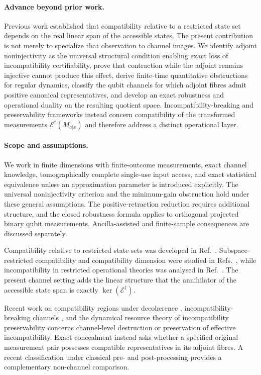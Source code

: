 \documentclass[
aps,pra,twocolumn,10pt,
superscriptaddress,longbibliography,floatfix
]{revtex4-2}
\begin{document}
\paragraph*{Advance beyond prior work.}
Previous work established that compatibility relative to a restricted state set depends on the real linear span of the accessible states. The present contribution is not merely to specialize that observation to channel images. We identify adjoint noninjectivity as the universal structural condition enabling exact loss of incompatibility certifiability, prove that contraction while the adjoint remains injective cannot produce this effect, derive finite-time quantitative obstructions for regular dynamics, classify the qubit channels for which adjoint fibres admit positive canonical representatives, and develop an exact robustness and operational duality on the resulting quotient space. Incompatibility-breaking and preservability frameworks instead concern compatibility of the transformed measurements $\mathcal E^\dagger(M_{a|x})$ and therefore address a distinct operational layer.

\paragraph*{Scope and assumptions.}
We work in finite dimensions with finite-outcome measurements, exact channel knowledge, tomographically complete single-use input access, and exact statistical equivalence unless an approximation parameter is introduced explicitly. The universal noninjectivity criterion and the minimum-gain obstruction hold under these general assumptions. The positive-retraction reduction requires additional structure, and the closed robustness formula applies to orthogonal projected binary qubit measurements. Ancilla-assisted and finite-sample consequences are discussed separately.

Compatibility relative to restricted state sets was developed in Ref.~\cite{Heinosaari2021FewStates}. Subspace-restricted compatibility and compatibility dimension were studied in Refs.~\cite{Loulidi2021,Uola2021Subspaces}, while incompatibility in restricted operational theories was analysed in Ref.~\cite{Plavala2022}. The present channel setting adds the linear structure that the annihilator of the accessible state span is exactly $\ker(\mathcal E^\dagger)$.

Recent work on compatibility regions under decoherence \cite{McNulty2026}, incompatibility-breaking channels \cite{Heinosaari2015IB}, and the dynamical resource theory of incompatibility preservability \cite{Hsieh2025} concerns channel-level destruction or preservation of effective incompatibility. Exact concealment instead asks whether a specified original measurement pair possesses compatible representatives in its adjoint fibres. A recent classification under classical pre- and post-processing \cite{Das2026} provides a complementary non-channel comparison.
\end{document}

